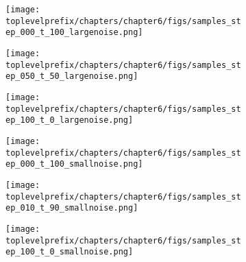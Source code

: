 \documentclass[../../book-main.tex]{subfiles}
\begin{document}
\begin{example}
  \begin{figure}[tbp]
    \centering
    \begin{subfigure}{0.32\textwidth}
      \texttt{[image: \\toplevelprefix/chapters/chapter6/figs/samples\_step\_000\_t\_100\_largenoise.png]}
    \end{subfigure}
    \hfill
    \begin{subfigure}{0.32\textwidth}
      \texttt{[image: \\toplevelprefix/chapters/chapter6/figs/samples\_step\_050\_t\_50\_largenoise.png]}
    \end{subfigure}
    \hfill
    \begin{subfigure}{0.32\textwidth}
      \texttt{[image: \\toplevelprefix/chapters/chapter6/figs/samples\_step\_100\_t\_0\_largenoise.png]}
    \end{subfigure}

    \vspace{2mm} %

    \begin{subfigure}{0.32\textwidth}
      \texttt{[image: \\toplevelprefix/chapters/chapter6/figs/samples\_step\_000\_t\_100\_smallnoise.png]}
    \end{subfigure}
    \hfill
    \begin{subfigure}{0.32\textwidth}
      \texttt{[image: \\toplevelprefix/chapters/chapter6/figs/samples\_step\_010\_t\_90\_smallnoise.png]}
    \end{subfigure}
    \hfill
    \begin{subfigure}{0.32\textwidth}
      \texttt{[image: \\toplevelprefix/chapters/chapter6/figs/samples\_step\_100\_t\_0\_smallnoise.png]}
    \end{subfigure}


\end{figure}
\end{example}
\end{document}
